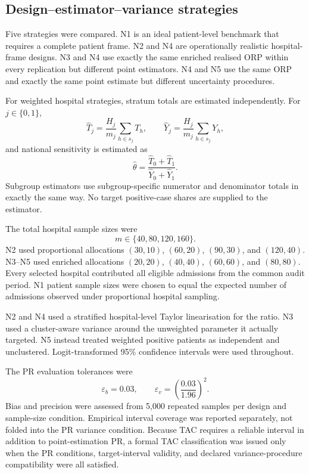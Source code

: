 \subsection{Design--estimator--variance strategies}

Five strategies were compared. N1 is an ideal patient-level benchmark that
requires a complete patient frame. N2 and N4 are operationally realistic
hospital-frame designs. N3 and N4 use exactly the same enriched realised ORP
within every replication but different point estimators. N4 and N5 use the
same ORP and exactly the same point estimate but different uncertainty
procedures.

For weighted hospital strategies, stratum totals are estimated independently.
For \(j\in\{0,1\}\),
\begin{equation}
  \widehat T_j
  =
  \frac{H_j}{m_j}\sum_{h\in s_j}T_h,
  \qquad
  \widehat Y_j
  =
  \frac{H_j}{m_j}\sum_{h\in s_j}Y_h,
  \label{eq:nav-stratum-totals}
\end{equation}
and national sensitivity is estimated as
\begin{equation}
  \widehat\theta
  =
  \frac{\widehat T_0+\widehat T_1}
       {\widehat Y_0+\widehat Y_1}.
  \label{eq:nav-combined-ratio}
\end{equation}
Subgroup estimators use subgroup-specific numerator and denominator totals in
exactly the same way. No target positive-case shares are supplied to the
estimator.



The total hospital sample sizes were
\[
  m\in\{40,80,120,160\}.
\]
N2 used proportional allocations
\((30,10)\), \((60,20)\), \((90,30)\), and \((120,40)\). N3--N5 used
enriched allocations \((20,20)\), \((40,40)\), \((60,60)\), and
\((80,80)\). Every selected hospital contributed all eligible admissions
from the common audit period. N1 patient sample sizes were chosen to equal the
expected number of admissions observed under proportional hospital sampling.

N2 and N4 used a stratified hospital-level Taylor linearisation for the ratio.
N3 used a cluster-aware variance around the unweighted parameter it actually
targeted. N5 instead treated weighted positive patients as independent and
unclustered. Logit-transformed 95\% confidence intervals were used throughout.

The PR evaluation tolerances were
\begin{equation}
  \varepsilon_b=0.03,
  \qquad
  \varepsilon_v
  =
  \left(\frac{0.03}{1.96}\right)^2.
  \label{eq:nav-pr-tolerances}
\end{equation}
Bias and precision were assessed from 5,000 repeated samples per design and
sample-size condition. Empirical interval coverage was reported separately,
not folded into the PR variance condition. Because TAC requires a reliable
interval in addition to point-estimation PR, a formal TAC classification was
issued only when the PR conditions, target-interval validity, and declared
variance-procedure compatibility were all satisfied.

